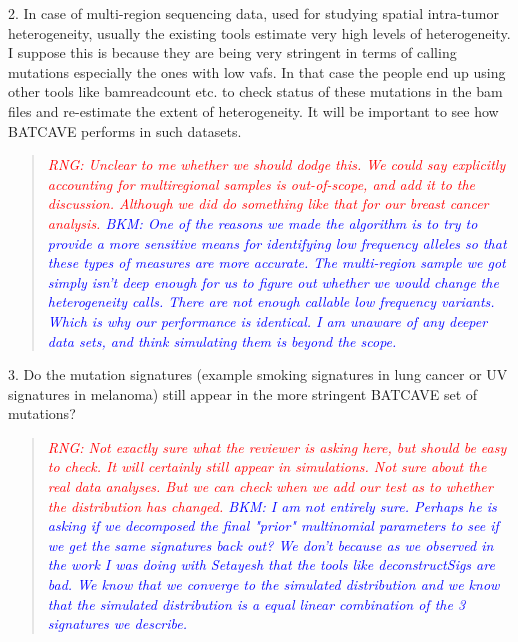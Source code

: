 \documentclass[11pt]{article}
\newcommand{\BKM}[1]{\textcolor{blue}{BKM: #1}}
\newcommand{\RNG}[1]{\textcolor{red}{RNG: #1}}
\newenvironment{response}
{\begin{quote}\itshape}
{\end{quote}}
\begin{document}
2. In case of multi-region sequencing data, used for studying spatial intra-tumor heterogeneity, usually the existing tools estimate very high levels of heterogeneity. I suppose this is because they are being very stringent in terms of calling mutations especially the ones with low vafs. In that case the people end up using other tools like bamreadcount etc. to check status of these mutations in the bam files and re-estimate the extent of heterogeneity. It will be important to see how BATCAVE performs in such datasets.
\begin{response}
\RNG{Unclear to me whether we should dodge this. We could say explicitly accounting for multiregional samples is out-of-scope, and add it to the discussion. Although we did do something like that for our breast cancer analysis.}
\BKM{One of the reasons we made the algorithm is to try to provide a more sensitive means for identifying low frequency alleles so that these types of measures are more accurate. The multi-region sample we got simply isn't deep enough for us to figure out whether we would change the heterogeneity calls. There are not enough callable low frequency variants. Which is why our performance is identical. I am unaware of any deeper data sets, and think simulating them is beyond the scope.}
\end{response}

3. Do the mutation signatures (example smoking signatures in lung cancer or UV signatures in melanoma) still appear in the more stringent BATCAVE set of mutations?
\begin{response}
\RNG{Not exactly sure what the reviewer is asking here, but should be easy to check. It will certainly still appear in simulations. Not sure about the real data analyses. But we can check when we add our test as to whether the distribution has changed.}
\BKM{I am not entirely sure. Perhaps he is asking if we decomposed the final "prior" multinomial parameters to see if we get the same signatures back out? We don't because as we observed in the work I was doing with Setayesh that the tools like deconstructSigs are bad. We know that we converge to the simulated distribution and we know that the simulated distribution is a equal linear combination of the 3 signatures we describe.}
\end{response}
\end{document}
